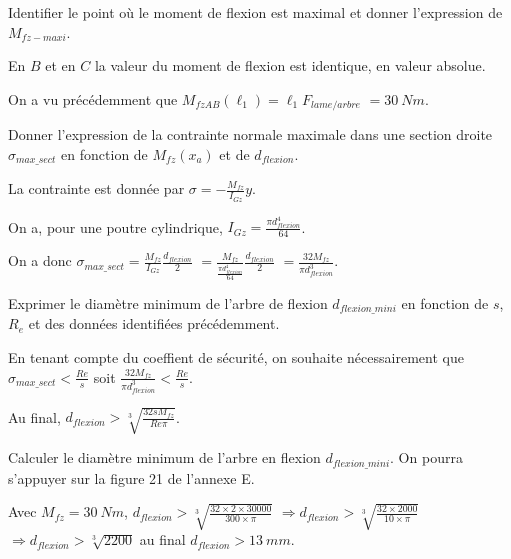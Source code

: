 \documentclass[11pt]{article}
\begin{document}
\UPSTIquestion Identifier le point où le moment de flexion est maximal et donner l'expression de $M_{fz-maxi}$.

\begin{UPSTIcorrige}
En $B$ et en $C$ la valeur du moment de flexion est identique, en valeur absolue. 

On a vu précédemment que $M_{fz AB}(\ell_1) = \ell_1  F_{lame/arbre}$ $=\SI{30}{Nm}$.
\end{UPSTIcorrige}

\UPSTIquestion Donner l'expression de la contrainte normale maximale dans une section droite $\sigma_{max\_sect}$ en fonction de $M_{fz}(x_a)$ et de $d_{flexion}$.

\begin{UPSTIcorrige}
La contrainte est donnée par $\sigma = -\frac{M_{fz}}{I_{Gz}}y$.

On a, pour une poutre cylindrique, $I_{Gz} = \frac{\pi d_{flexion}^4}{64} $. 

On a donc $\sigma_{max\_sect} = \frac{M_{fz}}{I_{Gz}} \frac{d_{flexion}}{2}$ 
$= \frac{M_{fz}}{\frac{\pi d_{flexion}^4}{64}} \frac{d_{flexion}}{2}$
$= \frac{32 M_{fz}}{\pi d_{flexion}^3} $.
\end{UPSTIcorrige}

\UPSTIquestion Exprimer le diamètre minimum de l'arbre de flexion $d_{flexion\_mini}$ en fonction de $s$, $R_e$ et des données identifiées précédemment. 

\begin{UPSTIcorrige}
En tenant compte du coeffient de sécurité, on souhaite nécessairement que 
$\sigma_{max\_sect} < \frac{Re}{s}$ soit $ \frac{32 M_{fz}}{\pi d_{flexion}^3}  < \frac{Re}{s}$.

Au final,  $d_{flexion}> \sqrt[3]{\frac{32 s M_{fz}}{Re \pi }} $.

\end{UPSTIcorrige}

\UPSTIquestion Calculer le diamètre minimum de l'arbre en flexion $d_{flexion\_mini}$. On pourra s'appuyer sur la figure 21 de l'annexe E. 

\begin{UPSTIcorrige}
Avec $ M_{fz} = \SI{30}{Nm}$, $d_{flexion}> \sqrt[3]{\frac{32 \times 2 \times 30 000}{300 \times \pi }} $ 
$ \Rightarrow d_{flexion}> \sqrt[3]{\frac{32 \times 2000 }{10 \times \pi }} $
$ \Rightarrow d_{flexion}> \sqrt[3]{2200} $ au final $d_{flexion}> \SI{13}{mm}$.

\end{UPSTIcorrige}
\end{document}
